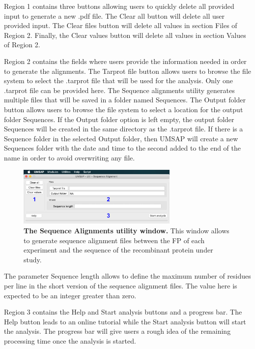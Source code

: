 Region \num{1} contains three buttons allowing users to quickly delete all provided input to generate a new .pdf file. The Clear all button will delete all user provided input. The Clear files button will delete all values in section Files of Region \num{2}. Finally, the Clear values button will delete all values in section Values of Region \num{2}.

Region \num{2} contains the fields where users provide the information needed in order to generate the alignments. The Tarprot file button allows users to browse the file system to select the .tarprot file that will be used for the analysis. Only one .tarprot file can be provided here. The Sequence alignments utility generates multiple files that will be saved in a folder named Sequences. The Output folder button allows users to browse the file system to select a location for the output folder Sequences. If the Output folder option is left empty, the output folder Sequences will be created in the same directory as the .tarprot file. If there is a Sequence folder in the selected Output folder, then UMSAP will create a new Sequences folder with the date and time to the second added to the end of the name in order to avoid overwriting any file. 

\begin{figure}[h]
	\centering
	\includegraphics[width=0.7\textwidth]{./IMAGES/UTIL-SEQ-WINDOW/util-seq.jpg}	    
	\caption[The Sequence Alignments utility window]{\textbf{The Sequence Alignments utility window.} This window allows to generate sequence alignment files between the FP of each experiment and the sequence of the recombinant protein under study.} 
	\label{fig:utilSeqAli}
	\vspace{-5pt} 	
\end{figure} 

The parameter Sequence length allows to define the maximum number of residues per line in the short version of the sequence alignment files. The value here is expected to be an integer greater than zero.

Region \num{3} contains the Help and Start analysis buttons and a progress bar. The Help button leads to an online tutorial while the Start analysis button will start the analysis. The progress bar will give users a rough idea of the remaining processing time once the analysis is started.

